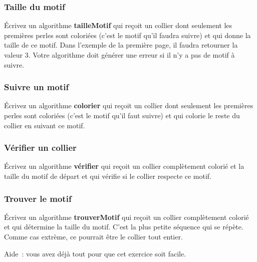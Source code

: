 		\subsubsection*{Taille du motif}
	
			Écrivez un algorithme \textbf{tailleMotif}
			qui reçoit un collier dont seulement les premières perles sont coloriées
			(c’est le motif qu’il faudra suivre)
			et qui donne la taille de ce motif.
			Dans l’exemple de la première page, il faudra retourner la valeur 3.
			Votre algorithme doit générer une erreur si il n’y a pas de motif à suivre.
	
		\subsubsection*{Suivre un motif}
		
			Écrivez un algorithme \textbf{colorier}
			qui reçoit un collier dont seulement les premières perles sont coloriées
			(c’est le motif qu’il faut suivre)
			et qui colorie le reste du collier en suivant ce motif.
			
		\subsubsection*{Vérifier un collier}
		
			Écrivez un algorithme \textbf{vérifier}
			qui reçoit un collier complètement colorié
			et la taille du motif de départ et qui vérifie
			si le collier respecte ce motif.
		
		\subsubsection*{Trouver le motif}
		
			Écrivez un algorithme \textbf{trouverMotif}
			qui reçoit un collier complètement colorié
			et qui détermine la taille du motif.
			C’est la plus petite séquence qui se répète.
			Comme cas extrème, ce pourrait être le collier tout entier.
		
			Aide~: vous avez déjà tout pour que cet exercice soit facile.

